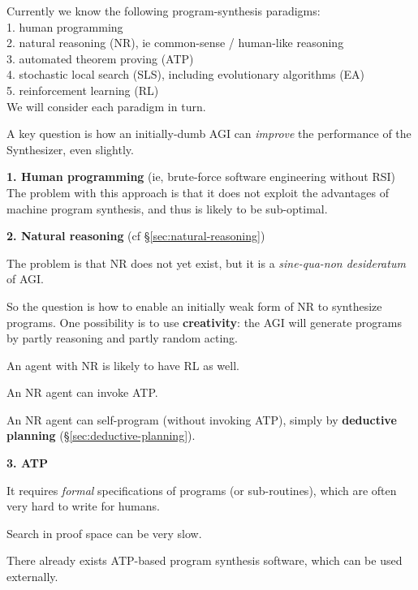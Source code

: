 Currently we know the following program-synthesis paradigms:\\
1.  human programming\\
2.  natural reasoning (NR), ie common-sense / human-like reasoning\\
3.  automated theorem proving (ATP)\\
4.  stochastic local search (SLS), including evolutionary algorithms (EA)\\
5.  reinforcement learning (RL) \\
We will consider each paradigm in turn.

A key question is how an initially-dumb AGI can \textit{improve} the performance of the Synthesizer, even slightly.

\textbf{1. Human programming} (ie, brute-force software engineering without RSI)\\ 
The problem with this approach is that it does not exploit the advantages of machine program synthesis, and thus is likely to be sub-optimal.

\textbf{2. Natural reasoning} (cf \S\ref{sec:natural-reasoning})
\begin{compactenum}[(a)]
\item  The problem is that NR does not yet exist, but it is a \textit{sine-qua-non desideratum} of AGI.
\item  So the question is how to enable an initially weak form of NR to synthesize programs.  One possibility is to use \textbf{creativity}:  the AGI will generate programs by partly reasoning and partly random acting.
\item  An agent with NR is likely to have RL as well.
\item  An NR agent can invoke ATP.
\item  An NR agent can self-program (without invoking ATP), simply by \textbf{deductive planning} (\S\ref{sec:deductive-planning}).\\
\end{compactenum}

\textbf{3. ATP} 
\begin{compactenum}[(a)]
\item  It requires \textit{formal} specifications of programs (or sub-routines), which are often very hard to write for humans.
\item  Search in proof space can be very slow.
\item  There already exists ATP-based program synthesis software, which can be used externally.\\
\end{compactenum}

